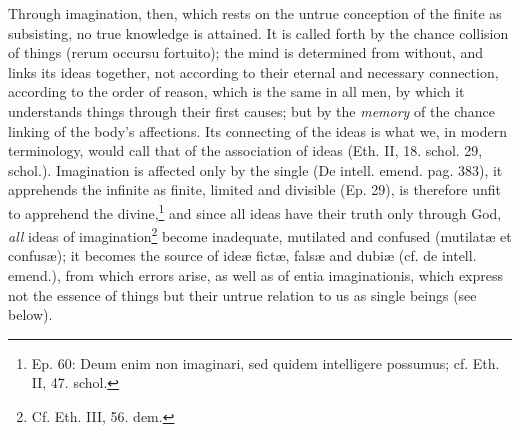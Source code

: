 \documentclass[12pt,a4paper,openany]{book}
\newcommand{\opage}[1]{\marginnote{\footnotesize\textit{[#1]}}}
\begin{document}
Through imagination, then, which rests on the untrue conception of
the finite as subsisting, no true
knowledge is attained. It is called forth by the chance collision
of things (rerum occursu fortuito); the mind is determined
from without, and links its ideas together, not according to their eternal and
necessary connection, according to the order of reason, which is the same in all men,
by which it understands things through their first
causes; but by the \emph{memory} of the chance linking
of the
\opage{91}\setcounter{footnote}{0}body's affections. Its connecting of the ideas is what
we, in modern terminology, would call that of the
association of ideas (Eth. II, 18. schol. 29, schol.).
Imagination is affected only by the single (De intell. emend.
pag. 383), it apprehends the infinite as finite, limited
and divisible (Ep. 29), is therefore unfit to apprehend the
divine,\footnote{Ep. 60: Deum enim non imaginari, sed
quidem intelligere possumus; cf. Eth. II, 47. schol.} and since
all ideas have their truth only through God, \emph{all}
ideas of imagination\footnote{Cf. Eth. III, 56. dem.}
become inadequate, mutilated and confused (mutilatæ et confusæ); it
becomes the source of ideæ fictæ, falsæ and dubiæ (cf. de intell.
emend.), from which errors arise, as well as of entia
imaginationis, which express not the essence of things but their
untrue relation to us as single beings (see below).
\end{document}

